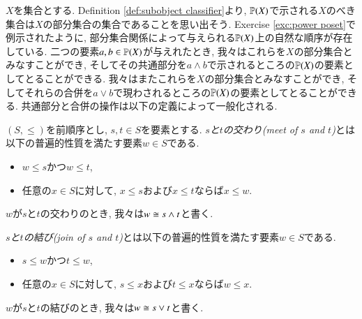 $X$を集合とする. Definition \ref{def:subobject classifier}より, ${\mathbb P}(X)$で示される$X$のべき集合は$X$の部分集合の集合であることを思い出そう. Exercise \ref{exc:power poset}で例示されたように, 部分集合関係によって与えられる${\mathbb P}(X)$上の自然な順序が存在している. 二つの要素$a,b\in{\mathbb P}(X)$が与えれたとき, 我々はこれらを$X$の部分集合とみなすことができ, そしてその共通部分を$a\wedge b$で示されるところの${\mathbb P}(X)$の要素としてとることができる. 我々はまたこれらを$X$の部分集合とみなすことができ, そしてそれらの合併を$a\vee b$で現わされるところの${\mathbb P}(X)$の要素としてとることができる. 共通部分と合併の操作は以下の定義によって一般化される.

\begin{definition}\label{def:meets and joins}


$(S,\leq)$を前順序とし, $s,t\in S$を要素とする. \emph{$s$と$t$の交わり(meet of $s$ and $t$)}とは以下の普遍的性質を満たす要素$w\in S$である.
\begin{itemize}
\item $w\leq s$かつ$w\leq t$,
\item 任意の$x\in S$に対して, $x\leq s$および$x\leq t$ならば$x\leq w$.
\end{itemize}
$w$が$s$と$t$の交わりのとき, 我々は$w\cong s\wedge t$と書く.


\emph{$s$と$t$の結び(join of $s$ and $t$)}とは以下の普遍的性質を満たす要素$w\in S$である.
\begin{itemize}
\item $s\leq w$かつ$t\leq w$, 
\item 任意の$x\in S$に対して, $s\leq x$および$t\leq x$ならば$w\leq x$.
\end{itemize}
$w$が$s$と$t$の結びのとき, 我々は$w\cong s\vee t$と書く.

\end{definition}

